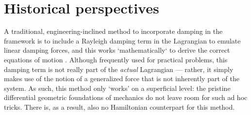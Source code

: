 \section{Historical perspectives}
A traditional, engineering-inclined method to incorporate damping in the framework is to include a Rayleigh damping term
in the Lagrangian to emulate linear damping forces, and this works `mathematically` to derive the correct equations of
motion \cite{Goldstein2011}. Although frequently used for practical problems, this damping term is not really part of
the \emph{actual} Lagrangian --- rather, it simply makes use of the notion of a generalized force that is not inherently
part of the system. As such, this method only `works' on a superficial level: the pristine differential geometric
foundations of mechanics do not leave room for such ad hoc tricks. There is, as a result, also no Hamiltonian
counterpart for this method. 

